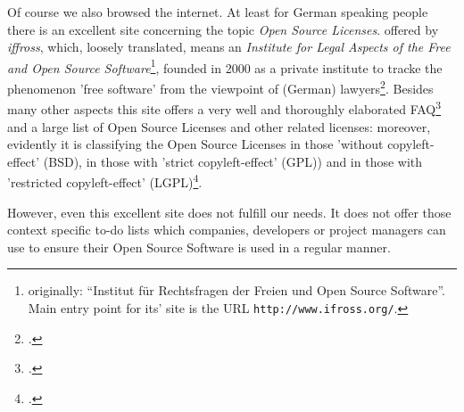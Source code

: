 %
%
%
%

%
Of course we also browsed the internet. At least for German speaking people
there is an excellent site concerning the topic \emph{Open Source Licenses}.
offered by \textit{iffross}, which, loosely translated, means an
\textit{Institute for Legal Aspects of the Free and Open Source
Software}\footnote{originally: \enquote{Institut für Rechtsfragen der Freien und
Open Source Software}. Main entry point for its' site is the URL
\texttt{http://www.ifross.org/}.}, founded in 2000 as a private institute to
tracke the phenomenon 'free software' from the viewpoint of (German)
lawyers\footcite[cf.][\nopage wp]{ifross2011b}. Besides many other
aspects this site offers a very well and thoroughly elaborated
FAQ\footcite[cf.][\nopage wp]{ifross2011c} and a large list of Open
Source Licenses and other related licenses: moreover, evidently it is
classifying the Open Source Licenses in those 'without copyleft-effect' (BSD),
in those with 'strict copyleft-effect' (GPL)) and in those with 'restricted
copyleft-effect' (LGPL)\footcite[cf.][\nopage wp]{ifross2011a}.

However, even this excellent site does not fulfill our needs. It does not offer
those context specific to-do lists which companies, developers or project
managers can use to ensure their Open Source Software is used in a regular
manner.

